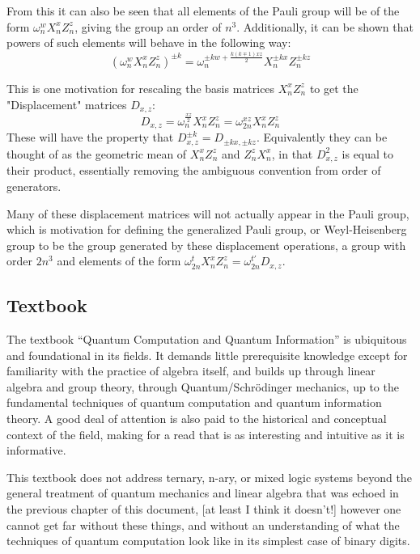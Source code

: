 \documentclass[]{article}
\begin{document}
From this it can also be seen that all elements of the Pauli group will be of the form $\omega_n^wX_n^xZ_n^z$, giving the group an order of $n^3$. Additionally, it can be shown that powers of such elements will behave in the following way:
\[(\omega_n^wX_n^xZ_n^z)^{\pm k} = \omega_n^{\pm kw+\frac{k(k \mp 1)xz}{2}}X_n^{\pm kx}Z_n^{\pm kz}\]

This is one motivation for rescaling the basis matrices $X_n^xZ_n^z$ to get the "Displacement" matrices $D_{x,z}$:
\[D_{x, z} = \omega_n^{\frac{xz}{2}}X_n^xZ_n^z = \omega_{2n}^{xz}X_n^xZ_n^z\]
These will have the property that $D_{x, z}^{\pm k} = D_{\pm kx, \pm kz}$. Equivalently they can be thought of as the geometric mean of $X_n^xZ_n^z$ and $Z_n^zX_n^x$, in that $D_{x,z}^2$ is equal to their product, essentially removing the ambiguous convention from order of generators.

Many of these displacement matrices will not actually appear in the Pauli group, which is motivation for defining the generalized Pauli group, or Weyl-Heisenberg group to be the group generated by these displacement operations, a group with order $2n^3$ and elements of the form $\omega_{2n}^tX_n^xZ_n^z = \omega_{2n}^{t'}D_{x, z}$.


\subsection{Textbook}
The textbook ``Quantum Computation and Quantum Information''\cite{textbook} is ubiquitous and foundational in its fields. It demands little prerequisite knowledge except for familiarity with the practice of algebra itself, and builds up through linear algebra and group theory, through Quantum/Schrödinger mechanics, up to the fundamental techniques of quantum computation and quantum information theory. A good deal of attention is also paid to the historical and conceptual context of the field, making for a read that is as interesting and intuitive as it is informative.

This textbook does not address ternary, n-ary, or mixed logic systems beyond the general treatment of quantum mechanics and linear algebra that was echoed in the previous chapter of this document, [at least I think it doesn't!] however one cannot get far without these things, and without an understanding of what the techniques of quantum computation look like in its simplest case of binary digits.
\end{document}
